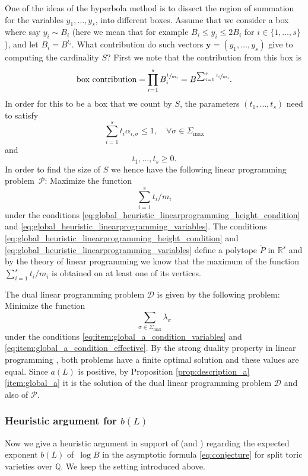 \documentclass[JEP,XML,SOM,Unicode,published]{cedram}
\newcommand{\bfy}{\boldsymbol{y}}
\newcommand\RR{\mathbb{R}}
\newcommand\QQ{\mathbb{Q}}
\theoremstyle{definition}
\numberwithin{theorem}{section}
\begin{document}
One of the ideas of the hyperbola method is to dissect the region of summation for the variables $y_1,\dots,y_s$, into different boxes. Assume that we consider a box where say $y_i \sim B_i$ (here we mean that for example $B_i\leq y_i\leq 2B_i$ for $i\in\{1,\dots,s\}$), and let $B_i=B^{t_i}$. What contribution do such vectors $\bfy=(y_1,\dots,y_s)$ give to computing the cardinality $S$? First we note that the contribution from this box is
\[
\text{box contribution} = \prod_{i=1}^sB_i^{\sfrac 1{m_i}}=B^{\sum_{i=1}^s \sfrac{t_i}{m_i} }.
\]
In order for this to be a box that we count by $S$, the parameters $(t_1,\dots,t_s)$ need to satisfy
\begin{equation}
\label{eq:global_heuristic_linearprogramming_height_condition}
\sum_{i=1}^s t_i \alpha_{i,\sigma}\leq 1, \quad \forall \sigma\in\Sigma_{\max}
\end{equation}
and
\begin{equation}
\label{eq:global_heuristic_linearprogramming_variables}
t_1,\dots,t_s\geq0.
\end{equation}
In order to find the size of $S$ we hence have the following linear programming problem~$\mathcal{P}$:
Maximize the function
\begin{equation}
\label{eq:maximize_global_function}
\sum_{i=1}^s t_i/m_i
\end{equation}
under the conditions \eqref{eq:global_heuristic_linearprogramming_height_condition} and \eqref{eq:global_heuristic_linearprogramming_variables}.
The conditions \eqref{eq:global_heuristic_linearprogramming_height_condition} and \eqref{eq:global_heuristic_linearprogramming_variables} define a polytope $\widetilde P$ in $\RR^s$ and by the theory of linear programming we know that the maximum of the function $\sum_{i=1}^s t_i/m_i$ is obtained on at least one of its vertices.

The dual linear programming problem $\mathcal{D}$ is given by the following problem:
Minimize the function
\[
\sum_{\sigma\in\Sigma_{\max}}\lambda_\sigma
\]
under the conditions \eqref{eq:item:global_a_condition_variables} and \eqref{eq:item:global_a_condition_effective}.
By the strong duality property in linear programming \cite[Ch.\,6]{Dantzig}, both problems have a finite optimal solution and these values are equal. Since $a(L)$ is positive, by Proposition \ref{prop:description_a}\eqref{item:global_a} it is the solution of the dual linear programming problem $\mathcal{D}$ and also of $\mathcal{P}$.

\subsubsection{Heuristic argument for $b(L)$}
Now we give a heuristic argument in support of \cite[Conj.\,1.1]{PSTVA}
(and \cite[\S3.3]{MR1032922})
regarding the expected exponent $b(L)$ of~$\log B$ in the asymptotic
formula \eqref{eq:conjecture} for split toric varieties over $\QQ$.
We keep the setting introduced above.
\end{document}
